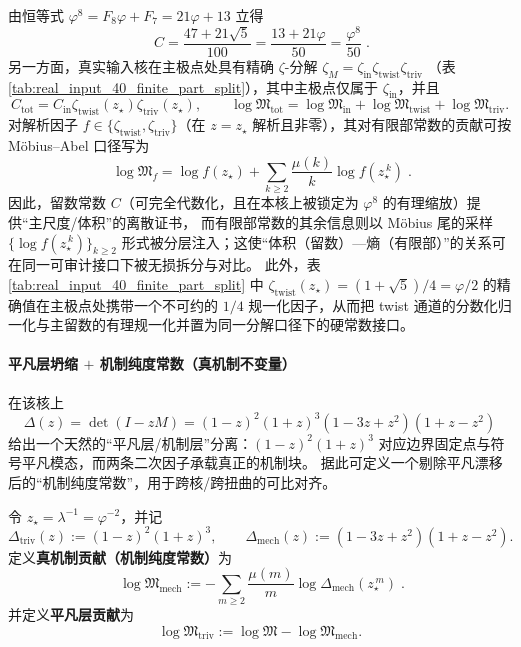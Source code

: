 \begin{remark}\label{rem:chi-ldp-residue-finite-part-layering}
由恒等式 \(\varphi^{8}=F_{8}\varphi+F_{7}=21\varphi+13\) 立得
\[
\boxed{\; C=\frac{47+21\sqrt5}{100}=\frac{13+21\varphi}{50}=\frac{\varphi^{8}}{50}\; }.
\]
另一方面，真实输入核在主极点处具有精确 \(\zeta\)-分解
\(
\zeta_M=\zeta_{\mathrm{in}}\zeta_{\mathrm{twist}}\zeta_{\mathrm{triv}}
\)
（表 \ref{tab:real_input_40_finite_part_split}），其中主极点仅属于 \(\zeta_{\mathrm{in}}\)，并且
\[
C_{\mathrm{tot}}=C_{\mathrm{in}}\zeta_{\mathrm{twist}}(z_\star)\zeta_{\mathrm{triv}}(z_\star),
\qquad
\log\mathfrak{M}_{\mathrm{tot}}=\log\mathfrak{M}_{\mathrm{in}}+\log\mathfrak{M}_{\mathrm{twist}}+\log\mathfrak{M}_{\mathrm{triv}}.
\]
对解析因子 \(f\in\{\zeta_{\mathrm{twist}},\zeta_{\mathrm{triv}}\}\)（在 \(z=z_\star\) 解析且非零），其对有限部常数的贡献可按 Möbius--Abel 口径写为
\[
\boxed{\;
\log\mathfrak{M}_f
=
\log f(z_\star)+\sum_{k\ge 2}\frac{\mu(k)}{k}\log f(z_\star^{\,k})\; }.
\]
因此，留数常数 \(C\)（可完全代数化，且在本核上被锁定为 \(\varphi^{8}\) 的有理缩放）提供“主尺度/体积”的离散证书，
而有限部常数的其余信息则以 Möbius 尾的采样 \(\{\log f(z_\star^{\,k})\}_{k\ge 2}\) 形式被分层注入；这使“体积（留数）—熵（有限部）”的关系可在同一可审计接口下被无损拆分与对比。
此外，表 \ref{tab:real_input_40_finite_part_split} 中 \(\zeta_{\mathrm{twist}}(z_\star)=(1+\sqrt5)/4=\varphi/2\) 的精确值在主极点处携带一个不可约的 \(1/4\) 规一化因子，从而把 twist 通道的分数化归一化与主留数的有理规一化并置为同一分解口径下的硬常数接口。
\end{remark}

\paragraph{平凡层坍缩 \texorpdfstring{$+$}{+} 机制纯度常数（真机制不变量）}
在该核上
\[
\Delta(z)=\det(I-zM)=(1-z)^2(1+z)^3(1-3z+z^2)(1+z-z^2)
\]
给出一个天然的“平凡层/机制层”分离：\((1-z)^2(1+z)^3\) 对应边界固定点与符号平凡模态，而两条二次因子承载真正的机制块。
据此可定义一个剔除平凡漂移后的“机制纯度常数”，用于跨核/跨扭曲的可比对齐。

\begin{definition}\label{def:real-input-40-mechanism-purity-constant}
令 \(z_\star=\lambda^{-1}=\varphi^{-2}\)，并记
\[
\Delta_{\mathrm{triv}}(z):=(1-z)^2(1+z)^3,\qquad
\Delta_{\mathrm{mech}}(z):=(1-3z+z^2)(1+z-z^2).
\]
定义\textbf{真机制贡献（机制纯度常数）}为
\[
\boxed{\;
\log\mathfrak{M}_{\mathrm{mech}}
:=
-\sum_{m\ge 2}\frac{\mu(m)}{m}\log \Delta_{\mathrm{mech}}(z_\star^{\,m})
\; }.
\]
并定义\textbf{平凡层贡献}为
\[
\boxed{\;
\log\mathfrak{M}_{\mathrm{triv}}
:=\log\mathfrak{M}-\log\mathfrak{M}_{\mathrm{mech}}.\;}
\]
\end{definition}

